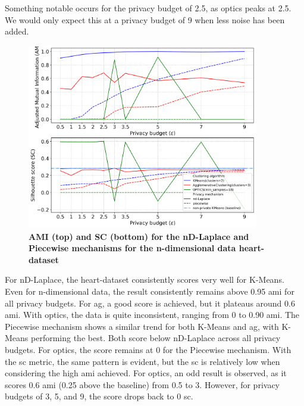 Something notable occurs for the privacy budget of 2.5, as \gls{optics} peaks at 2.5. We would only expect this at a privacy budget of 9 when less noise has been added.
\newpage
\begin{figure}[H]
  \centering

  \caption{\textbf{AMI (top) and SC (bottom) for the nD-Laplace and Piecewise mechanisms for the n-dimensional data heart-dataset}}
  \includegraphics[width=0.9\textwidth]{Results/nd-laplace/nd-Laplace/heart-dataset/ami-and-sc_9_dimensions.png}

  \label{fig:validation-heart-dataset_comparison_nd-laplace}
\end{figure}
For nD-Laplace, the heart-dataset consistently scores very well for K-Means. Even for n-dimensional data, the result consistently remains above 0.95 \gls{ami} for all privacy budgets.
For \gls{ag}, a good score is achieved, but it plateaus around 0.6 \gls{ami}.
With \gls{optics}, the data is quite inconsistent, ranging from 0 to 0.90 \gls{ami}.
The Piecewise mechanism shows a similar trend for both K-Means and \gls{ag}, with K-Means performing the best. Both score below nD-Laplace across all privacy budgets.
For \gls{optics}, the score remains at 0 for the Piecewise mechanism.
With the \gls{sc} metric, the same pattern is evident, but the \gls{sc} is relatively low when considering the high \gls{ami} achieved. For \gls{optics}, an odd result is observed, as it scores 0.6 \gls{ami} (0.25 above the baseline) from 0.5 to 3. However, for privacy budgets of 3, 5, and 9, the score drops back to 0 \gls{sc}.


